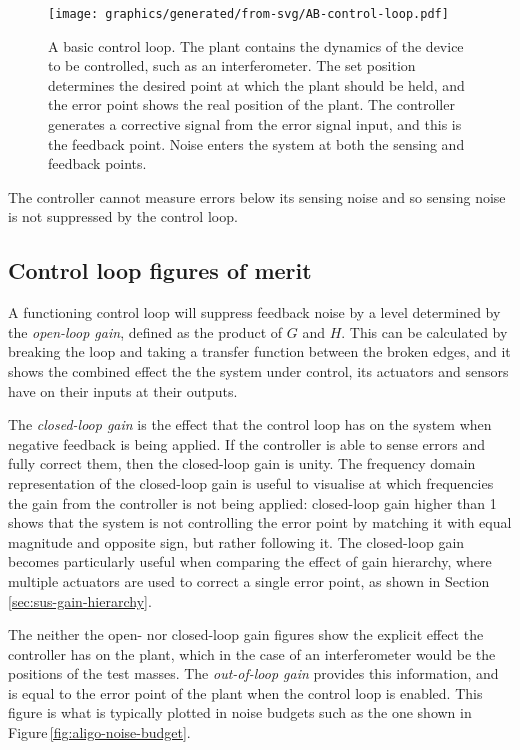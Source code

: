 \begin{figure}
  \centering
  \texttt{[image: graphics/generated/from-svg/AB-control-loop.pdf]}
  \caption[A basic control loop]{\label{fig:control-loop}A basic control loop. The plant contains the dynamics of the device to be controlled, such as an interferometer. The set position determines the desired point at which the plant should be held, and the error point shows the real position of the plant. The controller generates a corrective signal from the error signal input, and this is the feedback point. Noise enters the system at both the sensing and feedback points.}
\end{figure}

The controller cannot measure errors below its sensing noise and so sensing noise is not suppressed by the control loop.

\subsection{Control loop figures of merit}
A functioning control loop will suppress feedback noise by a level determined by the \emph{open-loop gain}, defined as the product of $G$ and $H$. This can be calculated by breaking the loop and taking a transfer function between the broken edges, and it shows the combined effect the the system under control, its actuators and sensors have on their inputs at their outputs.

The \emph{closed-loop gain} is the effect that the control loop has on the system when negative feedback is being applied. If the controller is able to sense errors and fully correct them, then the closed-loop gain is unity. The frequency domain representation of the closed-loop gain is useful to visualise at which frequencies the gain from the controller is not being applied: closed-loop gain higher than \num{1} shows that the system is not controlling the error point  by matching it with equal magnitude and opposite sign, but rather following it. The closed-loop gain becomes particularly useful when comparing the effect of gain hierarchy, where multiple actuators are used to correct a single error point, as shown in Section\,\ref{sec:sus-gain-hierarchy}.

The neither the open- nor closed-loop gain figures show the explicit effect the controller has on the plant, which in the case of an interferometer would be the positions of the test masses. The \emph{out-of-loop gain} provides this information, and is equal to the error point of the plant when the control loop is enabled. This figure is what is typically plotted in noise budgets such as the one shown in Figure\,\ref{fig:aligo-noise-budget}.

